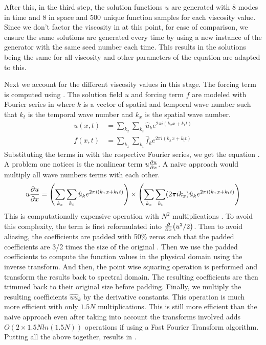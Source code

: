 After this, in the third step, the solution functions \(u \) are generated with 8 modes in time and 8 in space and \num{500} unique function samples for each viscosity value. Since we don't factor the viscosity in at this point, for ease of comparison, we ensure the same solutions are generated every time by using a new instance of the generator with the same seed number each time. This results in the solutions being the same for all viscosity and other parameters of the equation are adapted to this.

Next we account for the different viscosity values in this stage. The forcing term is computed using . The solution field \(u\) and forcing term \(f\) are modeled with Fourier series in  where \(k\) is a vector of spatial and temporal wave number such that \(k_t\) is the temporal wave number and \(k_x\) is the spatial wave number.
\begin{align}
  u\left(x, t \right) & = \sum_{k_{x}} \sum_{k_{t}} \hat{u}_k e^{2\pi i(k_{x}x+k_{t}t)} \label{eq:fourier_field} \\
  f\left(x, t \right) & = \sum_{k_{x}}\sum_{k_{t}} \hat{f}_k e^{2\pi i(k_{x}x+k_{t}t)} \label{eq:fourier_force}
\end{align}
Substituting the terms in  with the respective Fourier series, we get the equation . A problem one notices is the nonlinear term \(u\pdv{u}{x}\). A naive approach would multiply all wave numbers terms with each other.
\begin{align}
  u\pdv{u}{x} = \left(\sum_{k_{x}} \sum_{k_{t}} \hat{u}_k e^{2\pi i(k_{x}x+k_{t}t)}\right) \times \left(\sum_{k_{x}} \sum_{k_{t}} (2\pi i k_{x})\hat{u}_k e^{2\pi i(k_{x}x+k_{t}t)}\right)
\end{align}
This is computationally expensive operation with \(N^2\) multiplications \autocite{lariosMATH934BURGERS2021,robertsDealiasedConvolutionsPseudospectral2011,shenSpectralMethodsAlgorithms2011,orszagComparisonPseudospectralSpectral1972}. To avoid this complexity, the term is first reformulated into \(\pdv{x}(u^2/2)\). Then to avoid aliasing, the coefficients are padded with 50\% zeros such that the padded coefficients are 3/2 times the size of the original \autocite{orszagEliminationAliasingFiniteDifference1971, lariosMATH934BURGERS2021}. Then we use the padded coefficients to compute the function values in the physical domain using the inverse transform. And then, the point wise squaring operation is performed and transform the results back to spectral domain. The resulting coefficients are then trimmed back to their original size before padding. Finally, we multiply the resulting coefficients \(\hat{uu}_k\) by the derivative constants. This operation is much more efficient with only \(1.5 N\) multiplications. This is still more efficient than the naive approach even after taking into account the transforms involved adds \(O(2\times 1.5Nln(1.5N))\) operations if using a Fast Fourier Transform algorithm. Putting all the above together, results in .
